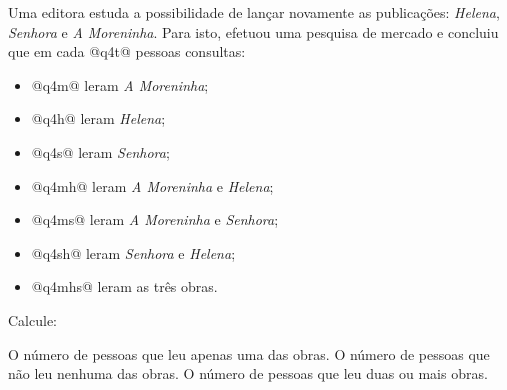 \documentclass[a4paper,11pt,addpoints]{exam}
\begin{document}
\begin{questions}
\begin{solution}[1in]

\end{solution}

\question[2]

Uma editora estuda a possibilidade de lançar novamente as publicações: \textit{Helena}, \textit{Senhora} e \textit{A Moreninha}. 
Para isto, efetuou uma pesquisa de mercado e concluiu que em cada @q4t@ pessoas consultas:

\begin{itemize}
  \item @q4m@ leram \textit{A Moreninha};
  \item @q4h@ leram \textit{Helena};
  \item @q4s@ leram \textit{Senhora};
  \item @q4mh@ leram \textit{A Moreninha} e \textit{Helena};
  \item @q4ms@ leram \textit{A Moreninha} e \textit{Senhora};
  \item @q4sh@ leram \textit{Senhora} e \textit{Helena};
  \item @q4mhs@ leram as três obras.
\end{itemize}

Calcule:

\begin{tasks}
  \task O número de pessoas que leu apenas uma das obras.
  \task O número de pessoas que não leu nenhuma das obras.
  \task O número de pessoas que leu duas ou mais obras.
\end{tasks}

\begin{solution}[1in]
  \begin{center}
    \begin{tikzpicture}


\end{tikzpicture}
\end{center}
\end{solution}
\end{questions}
\end{document}
